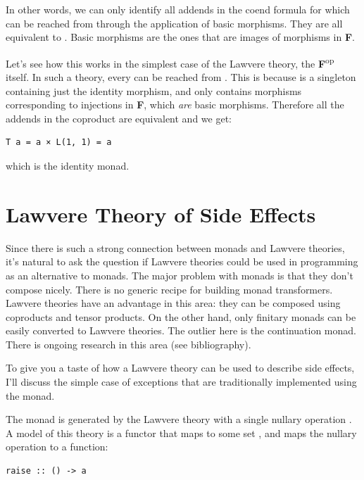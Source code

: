 In other words, we can only identify all addends in the coend formula
for which  can be reached from 
through the application of basic morphisms. They are all equivalent to
. Basic morphisms are the ones that are images of
morphisms in \textbf{F}.

Let's see how this works in the simplest case of the Lawvere theory, the
\textbf{F}\textsuperscript{op} itself. In such a theory, every
 can be reached from . This is because
 is a singleton containing just the identity morphism,
and  only contains morphisms corresponding to
injections  in \textbf{F}, which \emph{are}
basic morphisms. Therefore all the addends in the coproduct are
equivalent and we get:

\begin{verbatim}
T a = a × L(1, 1) = a
\end{verbatim}

which is the identity monad.

\section{Lawvere Theory of Side
Effects}\label{lawvere-theory-of-side-effects}

Since there is such a strong connection between monads and Lawvere
theories, it's natural to ask the question if Lawvere theories could be
used in programming as an alternative to monads. The major problem with
monads is that they don't compose nicely. There is no generic recipe for
building monad transformers. Lawvere theories have an advantage in this
area: they can be composed using coproducts and tensor products. On the
other hand, only finitary monads can be easily converted to Lawvere
theories. The outlier here is the continuation monad. There is ongoing
research in this area (see bibliography).

To give you a taste of how a Lawvere theory can be used to describe side
effects, I'll discuss the simple case of exceptions that are
traditionally implemented using the  monad.

The  monad is generated by the Lawvere theory with a
single nullary operation . A model of this
theory is a functor that maps  to some set , and
maps the nullary operation to a function:

\begin{verbatim}
raise :: () -> a
\end{verbatim}

